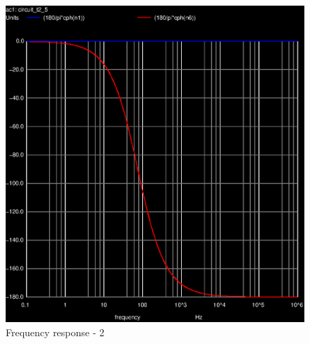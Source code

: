 \begin{figure}[ht]
	\centering
	\includegraphics[width=0.55\linewidth]{ac-2.eps}
	\caption{Frequency response - 2}
\label{fig:Dsnh_sim_t2}
\end{figure}


